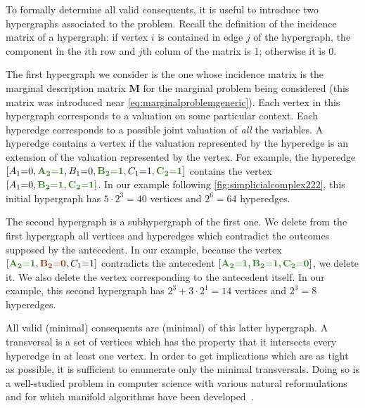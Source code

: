 \documentclass[aps,english,superscriptaddress,onecolumn,twoside,longbibliography,pra,floatfix,fleqn,nofootinbib]{revtex4-1}%
\newcommand*{\mred}[1]{{\color{RawSienna}{\mathbf{#1}}}}
\newcommand*{\mgreen}[1]{{\color{OliveGreen}{\mathbf{#1}}}}
\newcommand*{\tblue}[1]{{\color{MidnightBlue}{\textbf{#1}}}}
\theoremstyle{definition}
\newcounter{example}[section]
\newcommand{\cramp}[1]{\ensuremath{\mathord{#1}}}
\newcommand{\eql}{\cramp{=}}
\DeclarePairedDelimiter{\bracks}{\lbrack}{\rbrack}
\begin{document}
To formally determine all valid consequents, it is useful to introduce two hypergraphs associated to the problem.  Recall the definition of the incidence  matrix of a hypergraph: if vertex $i$ is contained in edge $j$ of the hypergraph, the component in the $i$th row and $j$th colum of the matrix  is 1; otherwise it is 0.  

The first hypergraph we consider is the one whose incidence matrix is the marginal description matrix $\bm{M}$ for the marginal problem being considered (this matrix was introduced near \cref{eq:marginalproblemgeneric}). 
Each vertex in this hypergraph corresponds to a valuation on some particular context. Each hyperedge corresponds to a possible joint valuation of \emph{all} the variables. A hyperedge contains a vertex if the valuation represented by the hyperedge is an extension of the valuation represented by the vertex. For example, the hyperedge $\bracks{A_1 \eql 0, \mgreen{A_2 \eql 1}, B_1 \eql 0, \mgreen{B_2 \eql 1}, C_1 \eql 1, \mgreen{C_2 \eql 1}}$ contains the vertex $\bracks{A_1 \eql 0,  \mgreen{B_2 \eql 1}, \mgreen{C_2 \eql 1}}$. In our example following \cref{fig:simplicialcomplex222}, this initial hypergraph has $5\cdot 2^3 = 40$ vertices and $2^6 = 64$ hyperedges. 

The second hypergraph is a subhypergraph of the first one. We delete from the first hypergraph all vertices and hyperedges which contradict the outcomes supposed by the antecedent. In our example, because the vertex $\bracks{\mgreen{A_2 \eql 1}, \mred{B_2 \eql 0}, C_1 \eql 1}$ contradicts the antecedent $\bracks{\mgreen{A_2 \eql 1}, \mgreen{B_2 \eql 1}, \mgreen{C_2 \eql 0}}$, we delete it. We also delete the vertex corresponding to the antecedent itself. In our example, this second hypergraph has $2^3 + 3\cdot 2^1 = 14$ vertices and $2^3 = 8$ hyperedges.

All valid (minimal) consequents are (minimal) \tblue{transversals} of this latter hypergraph. A transversal is a set of vertices which has the property that it intersects every hyperedge in at least one vertex. In order to get implications which are as tight as possible, it is sufficient to enumerate only the minimal transversals. Doing so is a well-studied problem in computer science with various natural reformulations and for which manifold algorithms have been developed~\cite{eiter_dualization_2008}.
\end{document}
